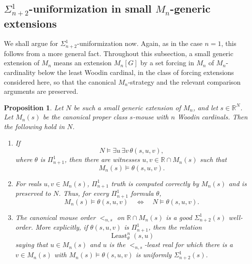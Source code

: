 \documentclass[a4paper,11pt]{article}
\newtheorem{proposition}[theorem]{Proposition}
\begin{document}
\subsection{\(\Sigma^1_{n+2}\)-uniformization in small \(M_n\)-generic extensions}
\label{subsec:sigman2-uniformization-mn-small}

We shall argue for \(\Sigma^1_{n+2}\)-uniformization now.  Again, as in the
case \(n=1\), this follows from a more general fact.  Throughout this
subsection, a small generic extension of \(M_n\) means an extension \(M_n[G]\)
by a set forcing in \(M_n\) of \(M_n\)-cardinality below the least Woodin
cardinal, in the class of forcing extensions considered here, so that the
canonical \(M_n\)-strategy and the relevant comparison arguments are preserved.

\begin{proposition}\label{prop:mn-relativized-capture}
Let \(N\) be such a small generic extension of \(M_n\), and let
\(s\in\mathbb R^N\).  Let \(M_n(s)\) be the canonical proper class
\(s\)-mouse with \(n\) Woodin cardinals.  Then the following hold in \(N\).
\begin{enumerate}
    \item If
    \[
       N\models \exists u\,\exists v\,\theta(s,u,v),
    \]
    where \(\theta\) is \(\Pi^1_{n+1}\), then there are witnesses
    \(u,v\in\mathbb R\cap M_n(s)\) such that
    \[
       M_n(s)\models \theta(s,u,v).
    \]

    \item For reals \(u,v\in M_n(s)\), \(\Pi^1_{n+1}\) truth is computed
    correctly by \(M_n(s)\) and is preserved to \(N\).  Thus, for every
    \(\Pi^1_{n+1}\) formula \(\theta\),
    \[
       M_n(s)\models\theta(s,u,v)
       \quad\Longleftrightarrow\quad
       N\models\theta(s,u,v).
    \]

    \item The canonical mouse order \(<_{n,s}\) on
    \(\mathbb R\cap M_n(s)\) is a good \(\Sigma^1_{n+2}(s)\) well-order.  More
    explicitly, if \(\theta(s,u,v)\) is \(\Pi^1_{n+1}\), then the relation
    \[
       \operatorname{Least}^{n}_{\theta}(s,u)
    \]
    saying that \(u\in M_n(s)\) and \(u\) is the \(<_{n,s}\)-least real for
    which there is a \(v\in M_n(s)\) with
    \(M_n(s)\models\theta(s,u,v)\) is uniformly \(\Sigma^1_{n+2}(s)\).
\end{enumerate}
\end{proposition}
\end{document}
